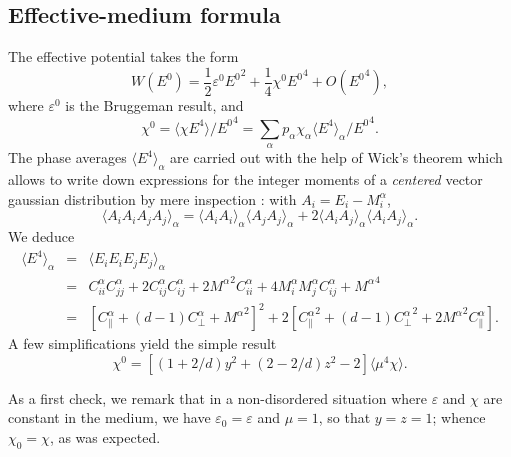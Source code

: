 \subsection{Effective-medium formula}
\label{scf}
The effective potential takes the form
\begin{equation}
W(E^0)=\frac{1}{2}\varepsilon^0 {E^0}^2+\frac{1}{4}\chi^0 {E^0}^4 
+O({E^0}^4),
\end{equation}
where $\varepsilon^0$ is the Bruggeman result, and \cite{STRO88,BERG89}
\begin{equation}
\chi^0=\langle \chi E^4\rangle/{E^0}^4=\sum_\alpha p_\alpha \chi_\alpha 
\langle E^4\rangle_\alpha/{E^0}^4.
\end{equation}
The phase averages $\langle E^4\rangle_\alpha$ are carried out with the 
help of Wick's theorem which allows to write down expressions for the 
integer moments of a {\em centered} vector gaussian distribution by 
mere inspection \cite{LEBE92}: with $A_i=E_i-M^\alpha_i$, 
\begin{equation}
\langle A_iA_iA_jA_j\rangle_\alpha
=\langle A_iA_i\rangle_\alpha\langle A_jA_j\rangle_\alpha
+2\langle A_iA_j\rangle_\alpha\langle A_iA_j\rangle_\alpha.
\end{equation}
We deduce
\begin{eqnarray}
\langle E^4\rangle_\alpha&=&
\langle E_i E_i E_j E_j\rangle_\alpha\nonumber\\
&=&C_{ii}^\alpha C_{jj}^\alpha
+2C_{ij}^\alpha C_{ij}^\alpha+2{M^\alpha}^2C_{ii}^\alpha
+4M^\alpha_iM^\alpha_jC_{ij}^\alpha+{M^\alpha}^4\nonumber\\
&=&\left[C_\parallel^\alpha+(d-1)C_\perp^\alpha
+{M^\alpha}^2\right]^2+2\left[{C_\parallel^\alpha}^2
+(d-1){C_\perp^\alpha}^2+2{M^\alpha}^2C_\parallel^\alpha\right].
\end{eqnarray}
A few simplifications yield the simple result
\begin{equation}
\label{csc}
\chi^0=\left[(1+2/d) y^2+(2-2/d)z^2-2\right]\langle \mu^4\chi\rangle.
\end{equation}

As a first check, we remark that in a non-disordered situation 
where $\varepsilon$ and $\chi$ are constant in the medium, we 
have $\varepsilon_0=\varepsilon$ and $\mu=1$, so that $y=z=1$; 
whence $\chi_0=\chi$, as was expected.


